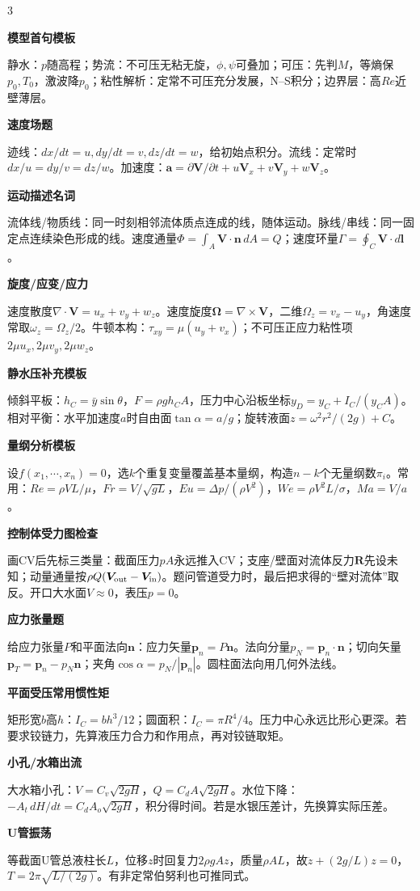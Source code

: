 \documentclass[a4paper]{article}
\newcommand{\qt}[1]{\vspace{0.25pt}\colorbox{Q}{\parbox{\dimexpr\linewidth-2\fboxsep}{\color{white}\bfseries #1}}\par}
\newcommand{\sect}[1]{\qt{#1}}
\begin{document}
\begin{multicols}{3}
{\sect{模型首句模板}
静水：$p$随高程；势流：不可压无粘无旋，$\phi,\psi$可叠加；可压：先判$M$，等熵保$p_0,T_0$，激波降$p_0$；粘性解析：定常不可压充分发展，N--S积分；边界层：高$Re$近壁薄层。
\sect{速度场题}
迹线：$dx/dt=u,dy/dt=v,dz/dt=w$，给初始点积分。流线：定常时$dx/u=dy/v=dz/w$。加速度：$\bm a=\partial\bm V/\partial t+u\bm V_x+v\bm V_y+w\bm V_z$。
\sect{运动描述名词}
流体线/物质线：同一时刻相邻流体质点连成的线，随体运动。脉线/串线：同一固定点连续染色形成的线。速度通量$\Phi=\int_A\bm V\cdot\bm n\,dA=Q$；速度环量$\Gamma=\oint_C\bm V\cdot d\bm l$。
\sect{旋度/应变/应力}
速度散度$\nabla\cdot\bm V=u_x+v_y+w_z$。速度旋度$\bm\Omega=\nabla\times\bm V$，二维$\Omega_z=v_x-u_y$，角速度常取$\omega_z=\Omega_z/2$。牛顿本构：$\tau_{xy}=\mu(u_y+v_x)$；不可压正应力粘性项$2\mu u_x,2\mu v_y,2\mu w_z$。
\sect{静水压补充模板}
倾斜平板：$h_C=\bar y\sin\theta$，$F=\rho gh_CA$，压力中心沿板坐标$y_D=y_C+I_C/(y_CA)$。相对平衡：水平加速度$a$时自由面$\tan\alpha=a/g$；旋转液面$z=\omega^2r^2/(2g)+C$。
\sect{量纲分析模板}
设$f(x_1,\cdots,x_n)=0$，选$k$个重复变量覆盖基本量纲，构造$n-k$个无量纲数$\pi_i$。常用：$Re=\rho VL/\mu$，$Fr=V/\sqrt{gL}$，$Eu=\Delta p/(\rho V^2)$，$We=\rho V^2L/\sigma$，$Ma=V/a$。
\sect{控制体受力图检查}
画CV后先标三类量：截面压力$pA$永远推入CV；支座/壁面对流体反力$\bm R$先设未知；动量通量按$\rho Q(\bm V_{\rm out}-\bm V_{\rm in})$。题问管道受力时，最后把求得的“壁对流体”取反。开口大水面$V\approx0$，表压$p=0$。
\sect{应力张量题}
给应力张量$P$和平面法向$\bm n$：应力矢量$\bm p_n=P\bm n$。法向分量$p_N=\bm p_n\cdot\bm n$；切向矢量$\bm p_T=\bm p_n-p_N\bm n$；夹角$\cos\alpha=p_N/|\bm p_n|$。圆柱面法向用几何外法线。
\sect{平面受压常用惯性矩}
矩形宽$b$高$h$：$I_C=bh^3/12$；圆面积：$I_C=\pi R^4/4$。压力中心永远比形心更深。若要求铰链力，先算液压力合力和作用点，再对铰链取矩。
\sect{小孔/水箱出流}
大水箱小孔：$V=C_v\sqrt{2gH}$，$Q=C_dA\sqrt{2gH}$。水位下降：$-A_t\,dH/dt=C_dA_o\sqrt{2gH}$，积分得时间。若是水银压差计，先换算实际压差。
\sect{U管振荡}
等截面U管总液柱长$L$，位移$z$时回复力$2\rho gAz$，质量$\rho AL$，故$\ddot z+(2g/L)z=0$，$T=2\pi\sqrt{L/(2g)}$。有非定常伯努利也可推同式。
}


\end{multicols}
\end{document}
